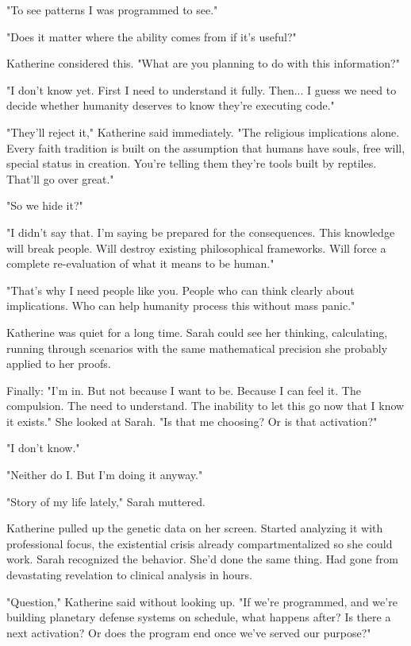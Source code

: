 "To see patterns I was programmed to see."

"Does it matter where the ability comes from if it's useful?"

Katherine considered this. "What are you planning to do with this information?"

"I don't know yet. First I need to understand it fully. Then... I guess we need to decide whether humanity deserves to know they're executing code."

"They'll reject it," Katherine said immediately. "The religious implications alone. Every faith tradition is built on the assumption that humans have souls, free will, special status in creation. You're telling them they're tools built by reptiles. That'll go over great."

"So we hide it?"

"I didn't say that. I'm saying be prepared for the consequences. This knowledge will break people. Will destroy existing philosophical frameworks. Will force a complete re-evaluation of what it means to be human."

"That's why I need people like you. People who can think clearly about implications. Who can help humanity process this without mass panic."

Katherine was quiet for a long time. Sarah could see her thinking, calculating, running through scenarios with the same mathematical precision she probably applied to her proofs.

Finally: "I'm in. But not because I want to be. Because I can feel it. The compulsion. The need to understand. The inability to let this go now that I know it exists." She looked at Sarah. "Is that me choosing? Or is that activation?"

"I don't know."

"Neither do I. But I'm doing it anyway."

"Story of my life lately," Sarah muttered.

Katherine pulled up the genetic data on her screen. Started analyzing it with professional focus, the existential crisis already compartmentalized so she could work. Sarah recognized the behavior. She'd done the same thing. Had gone from devastating revelation to clinical analysis in hours.

"Question," Katherine said without looking up. "If we're programmed, and we're building planetary defense systems on schedule, what happens after? Is there a next activation? Or does the program end once we've served our purpose?"

